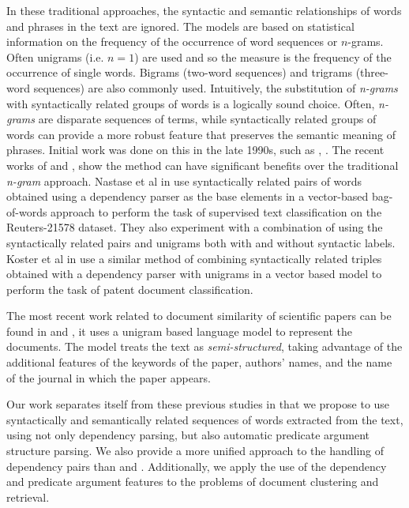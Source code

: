 \documentclass[11pt]{article}
\begin{document}
In these traditional approaches, the syntactic and semantic relationships of words and phrases in the text are ignored. The models are based on statistical information on the frequency of the occurrence of word sequences or $n$-grams. Often unigrams (i.e. $n=1$) are used and so the measure is the frequency of the occurrence of single words. Bigrams (two-word sequences) and trigrams (three-word sequences) are also commonly used. Intuitively, the substitution of \emph{n-grams} with syntactically related groups of words is a logically sound choice. Often, \emph{n-grams} are disparate sequences of terms, while syntactically related groups of words can provide a more robust feature that preserves the semantic meaning of phrases. Initial work was done on this in the late 1990s, such as \cite{Furnkranz1998}, \cite{Dumais1998}. The recent works of \cite{Nastase2007} and \cite{Koster2009}, show the method can have significant benefits over the traditional \emph{n-gram} approach. Nastase et al in \cite{Nastase2007} use syntactically related pairs of words obtained using a dependency parser as the base elements in a vector-based bag-of-words approach to perform the task of supervised text classification on the Reuters-21578 dataset. They also experiment with a combination of using the syntactically related pairs and unigrams both with and without syntactic labels. Koster et al in \cite{Koster2009} use a similar method of combining syntactically related triples obtained with a dependency parser with unigrams in a vector based model to perform the task of patent document classification.

The most recent work related to document similarity of scientific papers can be found in \cite{Hurtado2011} and \cite{Hurtado2013}, it uses a unigram based language model to represent the documents. The model treats the text as \emph{semi-structured}, taking advantage of the additional features of the keywords of the paper, authors' names, and the name of the journal in which the paper appears.

Our work separates itself from these previous studies in that we propose to use syntactically and semantically related sequences of words extracted from the text, using not only dependency parsing, but also automatic predicate argument structure parsing. We also provide a more unified approach to the handling of dependency pairs than \cite{Nastase2007} and \cite{Koster2009}. Additionally, we apply the use of the dependency and predicate argument features to the problems of document clustering and retrieval. 
\end{document}

